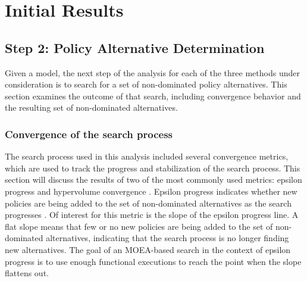 \label{analysis-results}
\chapter{Initial Results} 

\begin{abstract}
This chapter will present individual results of each of the model+method pairings without any direct comparisons made. Each pairing combines one model variation with one decision support method, both based on the configurations developed in \cref{part-develop}. The individual results provide a foundation for the comparisons made next, in \cref{chapter-comparison}. Results will be presented in three stages: policy alternative determination in \cref{results-step2}, uncertainty analysis in \cref{results-step3}, and finally scenario discovery in \cref{results-step4}. As the model specification phase does not include any direct results apart from the development of models that are used in the remaining steps, and as the model variations do not change based on the method used, there is no specific section that covers that step in this chapter. For details on the implementation of each model variation, see \cref{dev-step1}. 
\end{abstract}

\newpage

\section{Step 2: Policy Alternative Determination} \label{results-step2}
Given a model, the next step of the analysis for each of the three methods under consideration is to search for a set of non-dominated policy alternatives. This section examines the outcome of that search, including convergence behavior and the resulting set of non-dominated alternatives. 

    \subsection{Convergence of the search process} \label{results-convergence}
    The search process used in this analysis included several convergence metrics, which are used to track the progress and stabilization of the search process. This section will discuss the results of two of the most commonly used metrics: epsilon progress and hypervolume convergence \citep{Reed2013,Ward2015}. Epsilon progress indicates whether new policies are being added to the set of non-dominated alternatives as the search progresses \citep{Ward2015}. Of interest for this metric is the slope of the epsilon progress line. A flat slope means that few or no new policies are being added to the set of non-dominated alternatives, indicating that the search process is no longer finding new alternatives. The goal of an MOEA-based search in the context of epsilon progress is to use enough functional executions to reach the point when the slope flattens out.
    
